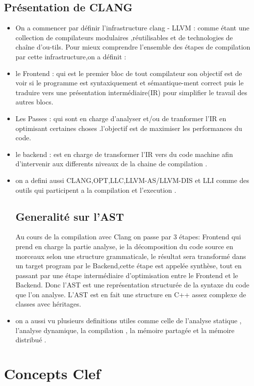 \documentclass[12pt,titlepage]{article}
\begin{document}
\subsection{Présentation de CLANG \cite{clangllvm}  }
\begin{itemize}
    \item On a commencer par définir l'infrastructure clang - LLVM : comme étant une collection de compilateurs modulaires ,réutilisables et de technologies de chaîne d’ou-tils. Pour mieux comprendre l’ensemble des étapes de compilation par cette infrastructure,on a définit :
    \item le Frontend : qui est le premier bloc de tout compilateur son objectif est de voir si le programme est syntaxiquement et sémantique-ment correct puis le traduire vers une présentation intermédiaire(IR) pour simplifier le travail des autres blocs.
    \item Les Passes : qui sont en charge d'analyser et/ou de tranformer l'IR en optimisant certaines choses .l'objectif est de maximiser les performances du code.
    \item le backend : est en charge de transformer l'IR vers du code machine afin d'intervenir aux differents niveaux de la chaine de compilation .
    \item on a defini aussi CLANG,OPT,LLC,LLVM-AS/LLVM-DIS et LLI comme des outils qui participent a la compilation et l'execution .
\subsection{Generalité sur l'AST}
    Au cours de la compilation avec Clang on passe par 3 étapes: Frontend qui prend en charge la partie analyse, ie la décomposition du code source en morceaux selon une structure grammaticale, le résultat sera transformé  dans un target program par le Backend,cette étape est appelée synthèse, tout en passant par une étape intermédiaire d'optimisation entre le Frontend et le Backend.\cite{Devlieghere}
    Donc l’AST est une représentation structurée de la syntaxe du code que l’on analyse. L’AST est en fait une structure en C++ assez complexe de classes avec héritages.
    \item on a aussi vu plusieurs definitions utiles comme celle de l'analyse statique , l'analyse dynamique, la compilation , la mémoire partagée et la mémoire distribué .
\end{itemize}
\section{Concepts Clef}
\end{document}
